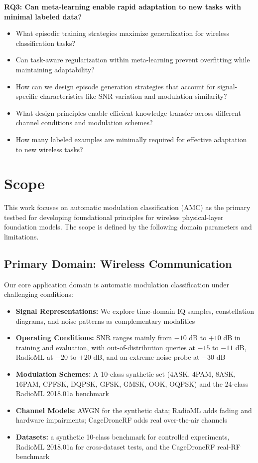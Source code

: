 \textbf{RQ3: Can meta-learning enable rapid adaptation to new tasks with minimal labeled data?}
\begin{itemize}
    \item What episodic training strategies maximize generalization for wireless classification tasks?
    \item Can task-aware regularization within meta-learning prevent overfitting while maintaining adaptability?
    \item How can we design episode generation strategies that account for signal-specific characteristics like SNR variation and modulation similarity?
    \item What design principles enable efficient knowledge transfer across different channel conditions and modulation schemes?
    \item How many labeled examples are minimally required for effective adaptation to new wireless tasks?
\end{itemize}

\section{Scope}
\label{sec:scope}

This work focuses on automatic modulation classification (AMC) as the primary testbed for developing foundational principles for wireless physical-layer foundation models. The scope is defined by the following domain parameters and limitations.

\subsection{Primary Domain: Wireless Communication}

Our core application domain is automatic modulation classification under challenging conditions:
\begin{itemize}
    \item \textbf{Signal Representations:} We explore time-domain IQ samples, constellation diagrams, and noise patterns as complementary modalities
    \item \textbf{Operating Conditions:} SNR ranges mainly from $-10$ dB to $+10$ dB in training and evaluation, with out-of-distribution queries at $-15$ to $-11$ dB, RadioML at $-20$ to $+20$ dB, and an extreme-noise probe at $-30$ dB
    \item \textbf{Modulation Schemes:} A 10-class synthetic set (4ASK, 4PAM, 8ASK, 16PAM, CPFSK, DQPSK, GFSK, GMSK, OOK, OQPSK) and the 24-class RadioML 2018.01a benchmark
    \item \textbf{Channel Models:} AWGN for the synthetic data; RadioML adds fading and hardware impairments; CageDroneRF adds real over-the-air channels
    \item \textbf{Datasets:} a synthetic 10-class benchmark for controlled experiments, RadioML 2018.01a for cross-dataset tests, and the CageDroneRF real-RF benchmark
\end{itemize}

